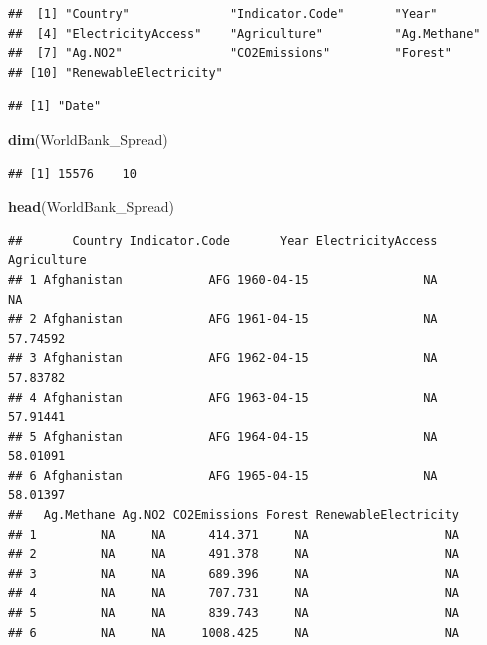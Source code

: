 \documentclass[12pt,]{article}
\newenvironment{Shaded}{\begin{snugshade}}{\end{snugshade}}
\newcommand{\KeywordTok}[1]{\textcolor[rgb]{0.13,0.29,0.53}{\textbf{#1}}}
\newcommand{\OperatorTok}[1]{\textcolor[rgb]{0.81,0.36,0.00}{\textbf{#1}}}
\newcommand{\NormalTok}[1]{#1}
\begin{document}
\begin{verbatim}
##  [1] "Country"              "Indicator.Code"       "Year"                
##  [4] "ElectricityAccess"    "Agriculture"          "Ag.Methane"          
##  [7] "Ag.NO2"               "CO2Emissions"         "Forest"              
## [10] "RenewableElectricity"
\end{verbatim}

\begin{Shaded}
\end{Shaded}

\begin{verbatim}
## [1] "Date"
\end{verbatim}

\begin{Shaded}
\begin{Highlighting}[]
\KeywordTok{dim}\NormalTok{(WorldBank_Spread)}
\end{Highlighting}
\end{Shaded}

\begin{verbatim}
## [1] 15576    10
\end{verbatim}

\begin{Shaded}
\begin{Highlighting}[]
\KeywordTok{head}\NormalTok{(WorldBank_Spread)}
\end{Highlighting}
\end{Shaded}

\begin{verbatim}
##       Country Indicator.Code       Year ElectricityAccess Agriculture
## 1 Afghanistan            AFG 1960-04-15                NA          NA
## 2 Afghanistan            AFG 1961-04-15                NA    57.74592
## 3 Afghanistan            AFG 1962-04-15                NA    57.83782
## 4 Afghanistan            AFG 1963-04-15                NA    57.91441
## 5 Afghanistan            AFG 1964-04-15                NA    58.01091
## 6 Afghanistan            AFG 1965-04-15                NA    58.01397
##   Ag.Methane Ag.NO2 CO2Emissions Forest RenewableElectricity
## 1         NA     NA      414.371     NA                   NA
## 2         NA     NA      491.378     NA                   NA
## 3         NA     NA      689.396     NA                   NA
## 4         NA     NA      707.731     NA                   NA
## 5         NA     NA      839.743     NA                   NA
## 6         NA     NA     1008.425     NA                   NA
\end{verbatim}
\end{document}
